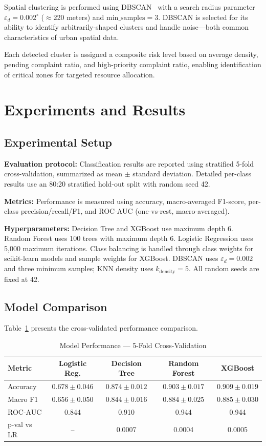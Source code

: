 \documentclass[12pt,onecolumn,draftclsnofoot]{IEEEtran}
\begin{document}
Spatial clustering is performed using DBSCAN~\cite{ester1996dbscan} with a search radius parameter $\varepsilon_d = 0.002^{\circ}$ ($\approx$220 meters) and $\text{min\_samples} = 3$. DBSCAN is selected for its ability to identify arbitrarily-shaped clusters and handle noise---both common characteristics of urban spatial data.

Each detected cluster is assigned a composite risk level based on average density, pending complaint ratio, and high-priority complaint ratio, enabling identification of critical zones for targeted resource allocation.

\FloatBarrier
\section{Experiments and Results}

\subsection{Experimental Setup}

\textbf{Evaluation protocol:} Classification results are reported using stratified 5-fold cross-validation, summarized as mean $\pm$ standard deviation. Detailed per-class results use an 80:20 stratified hold-out split with random seed 42.

\textbf{Metrics:} Performance is measured using accuracy, macro-averaged F1-score, per-class precision/recall/F1, and ROC-AUC (one-vs-rest, macro-averaged).

\textbf{Hyperparameters:} Decision Tree and XGBoost use maximum depth 6. Random Forest uses 100 trees with maximum depth 6. Logistic Regression uses 5,000 maximum iterations. Class balancing is handled through class weights for scikit-learn models and sample weights for XGBoost. DBSCAN uses $\varepsilon_d=0.002$ and three minimum samples; KNN density uses $k_{\text{density}}=5$. All random seeds are fixed at 42.

\subsection{Model Comparison}

Table~\ref{tab:model_cv} presents the cross-validated performance comparison.

\begin{table}[t]
\centering
\caption{Model Performance --- 5-Fold Cross-Validation}
\label{tab:model_cv}
\begin{tabular}{lcccc}
\toprule
Metric & Logistic Reg. & Decision Tree & Random Forest & XGBoost \\
\midrule
Accuracy & $0.678 \pm 0.046$ & $0.874 \pm 0.012$ & $0.903 \pm 0.017$ & $0.909 \pm 0.019$ \\
Macro F1 & $0.656 \pm 0.050$ & $0.844 \pm 0.016$ & $0.884 \pm 0.025$ & $0.885 \pm 0.030$ \\
ROC-AUC & 0.844 & 0.910 & 0.944 & 0.944 \\
p-val vs LR & -- & 0.0007 & 0.0004 & 0.0005 \\
\bottomrule
\end{tabular}
\end{table}
\end{document}
